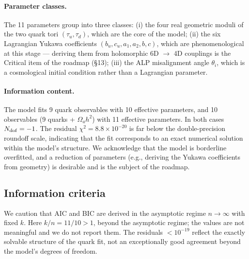 \documentclass[12pt,a4paper]{article}
\numberwithin{equation}{section}
\begin{document}
\paragraph{Parameter classes.}
The 11 parameters group into three classes: (i) the four real geometric moduli of the two quark tori \((\tau_u, \tau_d)\), which are the core of the model; (ii) the six Lagrangian Yukawa coefficients \((b_u, c_u, a_1, a_2, b, c)\), which are phenomenological at this stage --- deriving them from holomorphic 6D \(\to\) 4D couplings is the Critical item of the roadmap (\S13); (iii) the ALP misalignment angle \(\theta_i\), which is a cosmological initial condition rather than a Lagrangian parameter.

\paragraph{Information content.}
The model fits 9 quark observables with 10 effective parameters, and 10 observables (9 quarks + \(\Omega_a h^2\)) with 11 effective parameters. In both cases \(N_{\rm dof} = -1\). The residual \(\chi^2 = 8.8 \times 10^{-20}\) is far below the double-precision roundoff scale, indicating that the fit corresponds to an exact numerical solution within the model's structure. We acknowledge that the model is borderline overfitted, and a reduction of parameters (e.g., deriving the Yukawa coefficients from geometry) is desirable and is the subject of the roadmap.

\subsection{Information criteria}
We caution that AIC and BIC are derived in the asymptotic regime \(n \to \infty\) with fixed \(k\). Here \(k/n = 11/10 > 1\), beyond the asymptotic regime; the values are not meaningful and we do not report them. The residuals \(< 10^{-19}\) reflect the exactly solvable structure of the quark fit, not an exceptionally good agreement beyond the model's degrees of freedom.
\end{document}
